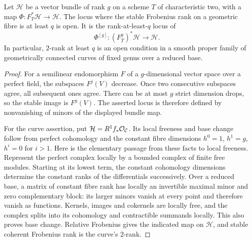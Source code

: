 \begin{lemma}\label{lem:stable-rank-open}
Let $\mathcal H$ be a vector bundle of rank $g$ on a scheme $T$ of characteristic two, with a map $\Phi:F_T^*\mathcal H\to\mathcal H$. The locus where the stable Frobenius rank on a geometric fibre is at least $q$ is open. It is the rank-at-least-$q$ locus of
\[
 \Phi^{[g]}:(F_T^g)^*\mathcal H\longrightarrow\mathcal H.
\]
In particular, $2$-rank at least $q$ is an open condition in a smooth proper family of geometrically connected curves of fixed genus over a reduced base.
\end{lemma}
\begin{proof}
For a semilinear endomorphism $F$ of a $g$-dimensional vector space over a perfect field, the subspaces $F^j(V)$ decrease. Once two consecutive subspaces agree, all subsequent ones agree. There can be at most $g$ strict dimension drops, so the stable image is $F^g(V)$. The asserted locus is therefore defined by nonvanishing of minors of the displayed bundle map.

For the curve assertion, put $\mathcal H=R^1f_*\mathcal O_{\mathcal C}$. Its local freeness and base change follow from perfect cohomology and the constant fibre dimensions $h^0=1$, $h^1=g$, $h^i=0$ for $i>1$. Here is the elementary passage from these facts to local freeness. Represent the perfect complex locally by a bounded complex of finite free modules. Starting at its lowest term, the constant cohomology dimensions determine the constant ranks of the differentials successively. Over a reduced base, a matrix of constant fibre rank has locally an invertible maximal minor and zero complementary block: its larger minors vanish at every point and therefore vanish as functions. Kernels, images and cokernels are locally free, and the complex splits into its cohomology and contractible summands locally. This also proves base change. Relative Frobenius gives the indicated map on $\mathcal H$, and stable coherent Frobenius rank is the curve's $2$-rank.
\end{proof}

